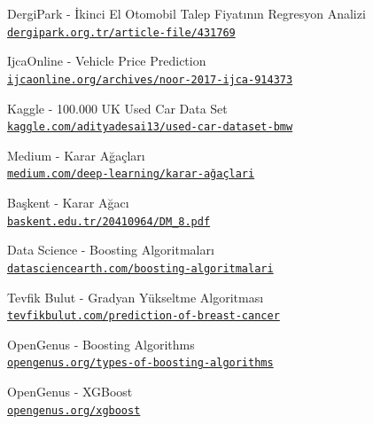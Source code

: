 \documentclass[conference]{IEEEtran}
\begin{document}
\newpage
\newpage
\begin{thebibliography}{16}

DergiPark - İkinci El Otomobil Talep Fiyatının Regresyon Analizi
\\\texttt{\href{https://dergipark.org.tr/tr/download/article-file/431769}{\nolinkurl{dergipark.org.tr/article-file/431769}}}

IjcaOnline - Vehicle Price Prediction
\\\texttt{\href{https://www.ijcaonline.org/archives/volume167/number9/noor-2017-ijca-914373.pdf}{\nolinkurl{ijcaonline.org/archives/noor-2017-ijca-914373}}}

Kaggle - 100.000 UK Used Car Data Set
\\\texttt{\href{https://www.kaggle.com/adityadesai13/used-car-dataset-ford-and-mercedes?select=bmw.csv}{\nolinkurl{kaggle.com/adityadesai13/used-car-dataset-bmw}}}

Medium - Karar Ağaçları
\\\texttt{\href{https://medium.com/deep-learning-turkiye/karar-ağaçları-makine-öğrenmesi-serisi-3-a03f3ff00ba5}{\nolinkurl{medium.com/deep-learning/karar-ağaçlari}}}

Başkent - Karar Ağacı
\\\texttt{\href{http://mail.baskent.edu.tr/~20410964/DM_8.pdf}{\nolinkurl{baskent.edu.tr/20410964/DM_8.pdf}}}

Data Science - Boosting Algoritmaları
\\\texttt{\href{https://www.datasciencearth.com/boosting-algoritmalari/}{\nolinkurl{datasciencearth.com/boosting-algoritmalari}}}

Tevfik Bulut - Gradyan Yükseltme Algoritması
\\\texttt{\href{https://tevfikbulut.com/2020/06/27/topluluk-ogrenme-algoritmalarindan-gradyan-yukseltme-algoritmasi-ile-gogus-kanserinin-tahmini-uzerine-bir-vaka-calismasi-a-case-study-on-the-prediction-of-breast-cancer-using-gradient-boosting-algori/}{\nolinkurl{tevfikbulut.com/prediction-of-breast-cancer}}}

OpenGenus - Boosting Algorithms
\\\texttt{\href{https://iq.opengenus.org/types-of-boosting-algorithms/}{\nolinkurl{opengenus.org/types-of-boosting-algorithms}}}

OpenGenus - XGBoost
\\\texttt{\href{https://iq.opengenus.org/xgboost/}{\nolinkurl{opengenus.org/xgboost}}}


\end{thebibliography}
\end{document}
